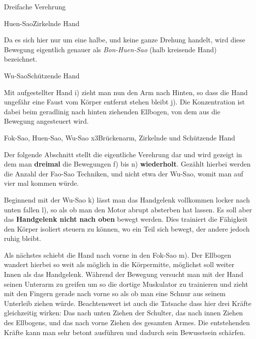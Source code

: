 \begin{WTSatz}{Dreifache Verehrung}
\begin{WTSatzTeil}{Huen-Sao}{Zirkelnde Hand}
		\begin{WTCommonBegriff}
			Da es sich hier nur um eine halbe, und keine ganze Drehung handelt, wird diese Bewegung eigentlich genauer als \textit{Bon-Huen-Sao} (halb kreisende Hand) bezeichnet.
		\end{WTCommonBegriff}

	\end{WTSatzTeil}
	\begin{WTSatzTeil}{Wu-Sao}{Sch\"utzende Hand}
		
		Mit aufgestellter Hand i) zieht man nun den Arm nach Hinten, so dass die Hand ungef\"ahr eine Faust vom K\"orper entfernt stehen bleibt j). Die Konzentration ist dabei beim geradlinig nach hinten ziehenden Ellbogen, von dem aus die Bewegung angesteuert wird.
		
	\end{WTSatzTeil}
	\begin{WTSatzTeil}{Fok-Sao, Huen-Sao, Wu-Sao x3}{Br\"uckenarm, Zirkelnde und Sch\"utzende Hand}
		
		Der folgende Abschnitt stellt die eigentliche Verehrung dar und wird gezeigt in dem man \textbf{dreimal} die Bewegungen f) bis n) \textbf{wiederholt}. Gez\"ahlt hierbei werden die Anzahl der Fao-Sao Techniken, und nicht etwa der Wu-Sao, womit man auf vier mal kommen w\"urde.

		
		Beginnend mit der Wu-Sao k) l\"asst man das Handgelenk vollkommen locker nach unten fallen l), so als ob man den Motor abrupt absterben hat lassen\label{LBL_motorabsterben}. Es soll aber das \textbf{Handgelenk nicht nach oben} bewegt werden. Dies trainiert die F\"ahigkeit den K\"orper isoliert steuern zu k\"onnen, wo ein Teil sich bewegt, der andere jedoch ruhig bleibt.

		Als n\"achstes schiebt die Hand nach vorne in den Fok-Sao m). Der Ellbogen wandert hierbei so weit als m\"oglich in die K\"orpermitte, m\"oglichst soll weiter Innen als das Handgelenk. W\"ahrend der Bewegung versucht man mit der Hand seinen Unterarm zu greifen um so die dortige Muskulator zu trainieren und zieht mit den Fingern gerade nach vorne so als ob man eine Schnur aus seinem Unterleib ziehen w\"urde. Beachtenswert ist auch die Tatsache dass hier drei Kr\"afte gleichzeitig wirken: Das nach unten Ziehen der Schulter, das nach innen Ziehen des Ellbogens, und das nach vorne Ziehen des gesamten Armes. Die entstehenden Kr\"afte kann man sehr betont ausf\"uhren und dadurch sein Bewusstsein sch\"arfen.


\end{WTSatzTeil}
\end{WTSatz}
